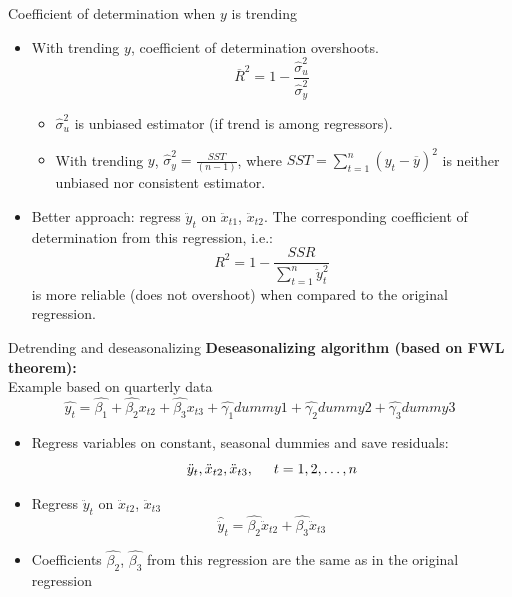 \documentclass{beamer}
\begin{document}
\begin{frame}{Coefficient of determination when $y$ is trending}
\begin{itemize}
\item With trending $y$, coefficient of determination overshoots.
$$\overline{R}^2=1-\frac{\hat{\sigma}^2_u}{\hat{\sigma}^2_y}$$
\begin{itemize}
\item $\hat{\sigma}^2_u$ is unbiased estimator (if trend is among regressors).\\
\medskip
\item With trending $y$, $\hat{\sigma}^2_y=\frac{SST}{(n-1)}$, where $SST=\sum_{t=1}^n (y_t-\overline{y})^2$ is neither unbiased nor consistent estimator.
\end{itemize}
\bigskip
\item Better approach: regress $\ddot{y}_{t}$ on $\ddot{x}_{t1}$, $\ddot{x}_{t2}$. The corresponding coefficient of determination from this regression, i.e.: 
$$R^2=1-\frac{SSR}{\sum^n_{t=1}\ddot{y}^2_t}$$ 
is more reliable (does not overshoot) when compared to the original regression.
\end{itemize}
\end{frame}
\begin{frame}{Detrending and deseasonalizing} 
\textbf{Deseasonalizing algorithm (based on FWL theorem):} \\
\footnotesize{Example based on quarterly data} 
$$\hat{y_t}=\hat{\beta_1}+\hat{\beta_2}x_{t2}+\hat{\beta_3}x_{t3}+\hat{\gamma_1}\textit{dummy}1+\hat{\gamma_2}\textit{dummy}2+\hat{\gamma_3}\textit{dummy}3$$
\begin{itemize}
\item Regress variables on constant, seasonal dummies and save residuals: $$\ddot{y}_{t}, \ddot{x}_{t2}, \ddot{x}_{t3}, \hspace{0.5cm} t=1, 2,\dots, n$$
\item Regress $\ddot{y}_{t}$ on $\ddot{x}_{t2}$, $\ddot{x}_{t3}$
$$\hat{\ddot{y}}_{t}=\hat{\beta_2}\ddot{x}_{t2}+\hat{\beta_3}\ddot{x}_{t3}$$
\item Coefficients $\hat{\beta_2}$, $\hat{\beta_3}$ from this regression are the same as in the original regression 
\end{itemize}
\end{frame}
\end{document}
